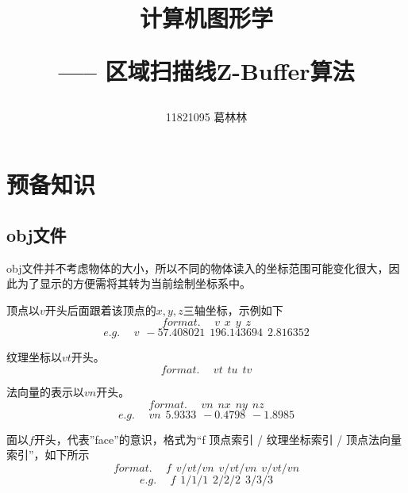 \documentclass[10pt]{article}
\title{计算机图形学 \hspace{2pt}\hspace{2pt} \begin{large}----- \hspace{2pt} 区域扫描线Z-Buffer算法 \end{large} }
\author{11821095 葛林林}
\begin{document}
\maketitle


\section{预备知识}
\subsection{obj文件}
obj文件并不考虑物体的大小，所以不同的物体读入的坐标范围可能变化很大，因此为了显示的方便需将其转为当前绘制坐标系中。

顶点以$v$开头后面跟着该顶点的$x,y,z$三轴坐标，示例如下
$$format. \hspace{15pt} v\hspace{5pt} x\hspace{5pt}y\hspace{5pt}z$$
$$e.g. \hspace{15pt} v\hspace{5pt} -57.408021\hspace{5pt}196.143694\hspace{5pt}2.816352$$

纹理坐标以$vt$开头。
$$format.\hspace{15pt} vt \hspace{5pt}tu \hspace{5pt} tv$$
$$$$

法向量的表示以$vn$开头。
$$format.\hspace{15pt} vn \hspace{5pt} nx \hspace{5pt} ny \hspace{5pt} nz$$
$$e.g. \hspace{15pt} vn \hspace{5pt} 5.9333 \hspace{5pt} -0.4798 \hspace{5pt} -1.8985$$

面以$f$开头，代表”face”的意识，格式为“f 顶点索引 / 纹理坐标索引 / 顶点法向量索引”，如下所示
$$format.\hspace{15pt} f \hspace{5pt} v/vt/vn \hspace{5pt} v/vt/vn \hspace{5pt} v/vt/vn$$
$$e.g.\hspace{15pt} f \hspace{5pt} 1/1/1 \hspace{5pt} 2/2/2 \hspace{5pt} 3/3/3$$
\end{document}
